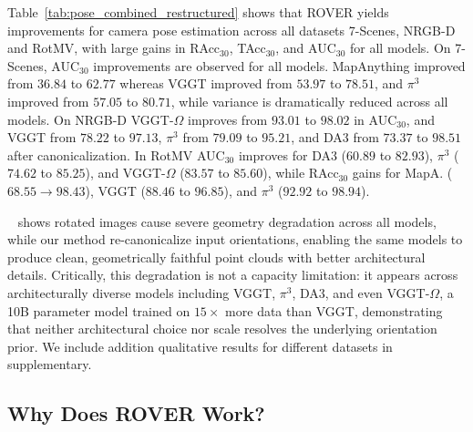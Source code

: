 Table~\ref{tab:pose_combined_restructured} shows that ROVER yields improvements for camera pose estimation across all datasets 7-Scenes, NRGB-D and RotMV, with large gains in RAcc$_{30}$, TAcc$_{30}$, and AUC$_{30}$ for all models. 
On 7-Scenes, AUC$_{30}$ improvements are observed for all models. MapAnything improved from $36.84$ to $62.77$ whereas VGGT improved from $53.97$ to $78.51$, and $\pi^3$ improved from $57.05$ to $80.71$, while variance is dramatically reduced across all models. 
On NRGB-D VGGT-$\Omega$ improves from $93.01$ to $98.02$ in AUC$_{30}$, and VGGT from $78.22$ to $97.13$, $\pi^3$ from $79.09$ to $95.21$, and DA3 from $73.37$ to $98.51$ after canonicalization. In RotMV AUC$_{30}$ improves for DA3 
($60.89$ to $82.93$), $\pi^3$ ($74.62$ to $85.25$), and VGGT-$\Omega$ ($83.57$ to $85.60$), while RAcc$_{30}$ gains for MapA. ($68.55 \to 98.43$), VGGT ($88.46$ to $96.85$), and $\pi^3$ ($92.92$ to $98.94$). 

~ shows rotated images cause severe geometry degradation across all models, while our method re-canonicalize input orientations, enabling the same models to produce clean, geometrically faithful point clouds with better architectural details. Critically, this degradation is not a capacity limitation: it appears across architecturally diverse models including VGGT, $\pi^3$, DA3, and even VGGT-$\Omega$, a 10B parameter model trained on $15\times$ more data than VGGT, demonstrating that neither architectural choice nor scale resolves the underlying orientation prior. We include addition qualitative results for different datasets in supplementary.

\subsection{Why Does ROVER Work?}
\label{sec:ablation}

